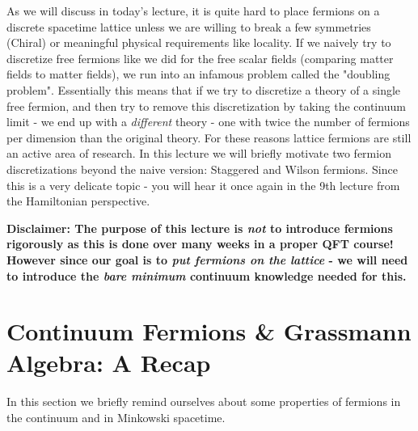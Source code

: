\documentclass[11pt]{article}
\theoremstyle{definition}
\begin{document}
As we will discuss in today's lecture, it is quite hard to place fermions on a discrete spacetime lattice unless we are willing to break a few symmetries (Chiral) or meaningful physical requirements like locality. If we naively try to discretize free fermions like we did for the free scalar fields (comparing matter fields to matter fields), we run into an infamous problem called the "doubling problem". Essentially this means that if we try to discretize a theory of a single free fermion, and then try to remove this discretization by taking the continuum limit - we end up with a \textit{different} theory - one with twice the number of fermions per dimension than the original theory. For these reasons lattice fermions are still an active area of research. In this lecture we will briefly motivate two fermion discretizations beyond the naive version: Staggered and Wilson fermions. Since this is a very delicate topic - you will hear it once again in the 9th lecture from the Hamiltonian perspective.

\textbf{Disclaimer: The purpose of this lecture is \textit{not} to introduce fermions rigorously as this is done over many weeks in a proper QFT course! However since our goal is to \textit{put fermions on the lattice} - we will need to introduce the \textit{bare minimum} continuum knowledge needed for this.}

\section{Continuum Fermions \& Grassmann Algebra: A Recap}
In this section we briefly remind ourselves about some properties of fermions in the continuum and in Minkowski spacetime. 
\end{document}
